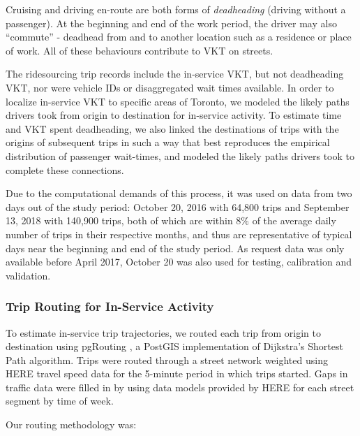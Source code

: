 \documentclass[]{trbunofficial_bdit_final}
\begin{document}
Cruising and driving en-route are both forms of \emph{deadheading} (driving
without a passenger). At the beginning and end of the work period, the driver
may also ``commute'' - deadhead from and to another location such as a residence
or place of work. All of these behaviours contribute to VKT on streets.

The ridesourcing trip records include the in-service VKT, but not deadheading
VKT, nor were vehicle IDs or disaggregated wait times available. In order to localize
in-service VKT to specific areas of Toronto, we modeled the likely paths
drivers took from origin to destination for in-service activity. To estimate
time and VKT spent deadheading, we also linked the destinations of trips
with the origins of subsequent trips in such a way that best reproduces the
empirical distribution of passenger wait-times, and modeled the likely paths
drivers took to complete these connections.

Due to the computational demands of this process, it was used on data from two
days out of the study period: October 20, 2016 with 64,800 trips and September
13, 2018 with 140,900 trips, both of which are within \(8\%\) of
the average daily number of trips in their respective months, and
thus are representative of typical days near the beginning and end of the study
period. As request data was only available before April 2017, October 20
was also used for testing, calibration and validation.

\hypertarget{sec:triprouting}{%
\subsubsection{Trip Routing for In-Service Activity}\label{sec:triprouting}}

To estimate in-service trip trajectories, we routed each trip from origin to
destination using pgRouting \citep{pgrouting}, a PostGIS \citep{postgis}
implementation of Dijkstra's Shortest Path algorithm. Trips were routed through
a street network weighted using HERE travel speed data for the 5-minute period
in which trips started. Gaps in traffic data were filled in by using data
models provided by HERE for each street segment by time of week.

Our routing methodology was:
\end{document}
